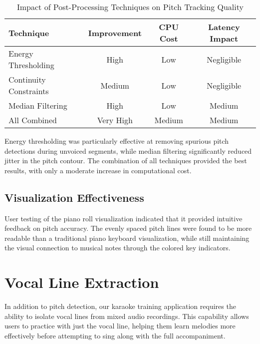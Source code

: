 \documentclass[conference]{IEEEtran}
\begin{document}
\begin{table}[htbp]
\caption{Impact of Post-Processing Techniques on Pitch Tracking Quality}
\begin{center}
\begin{tabular}{|l|c|c|c|}
\hline
\textbf{Technique} & \textbf{Improvement} & \textbf{CPU Cost} & \textbf{Latency Impact} \\
\hline
Energy Thresholding & High & Low & Negligible \\
\hline
Continuity Constraints & Medium & Low & Negligible \\
\hline
Median Filtering & High & Low & Medium \\
\hline
All Combined & Very High & Medium & Medium \\
\hline
\end{tabular}
\label{tab:post_processing}
\end{center}
\end{table}

Energy thresholding was particularly effective at removing spurious pitch detections during unvoiced segments, while median filtering significantly reduced jitter in the pitch contour. The combination of all techniques provided the best results, with only a moderate increase in computational cost.

\subsection{Visualization Effectiveness}
User testing of the piano roll visualization indicated that it provided intuitive feedback on pitch accuracy. The evenly spaced pitch lines were found to be more readable than a traditional piano keyboard visualization, while still maintaining the visual connection to musical notes through the colored key indicators.

\section{Vocal Line Extraction}

In addition to pitch detection, our karaoke training application requires the ability to isolate vocal lines from mixed audio recordings. This capability allows users to practice with just the vocal line, helping them learn melodies more effectively before attempting to sing along with the full accompaniment.
\end{document}
